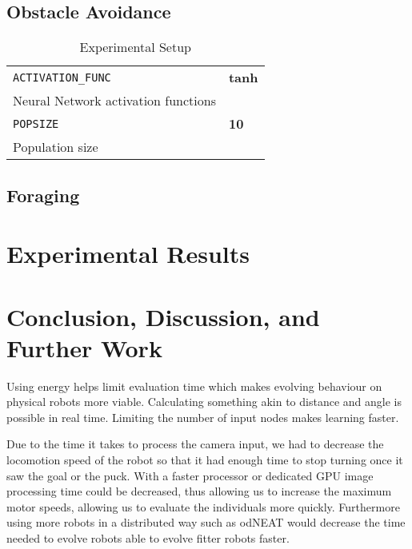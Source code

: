 \documentclass{article}
\begin{document}
	\subsection{Obstacle Avoidance}
\begin{table}
	\centering
	\begin{tabular}{l l}
		\texttt{ACTIVATION\_FUNC} & \textbf{tanh} \\
		Neural Network activation functions & \\
		\texttt{POPSIZE} & \textbf{10} \\
		Population size
	\end{tabular}
	\caption{Experimental Setup}
	\label{tab:obstacle_parameters}
\end{table}

	\subsection{Foraging}


	\section{Experimental Results} %
	\label{sec:results}
	

	\section{Conclusion, Discussion, and Further Work} %
	\label{sec:conclusion}
	Using energy helps limit evaluation time which makes evolving behaviour on
	physical robots more viable.
	Calculating something akin to distance and angle is possible in real time.
	Limiting the number of input nodes makes learning faster. %

	Due to the time it takes to process the camera input, we had to decrease
	the locomotion speed of the robot so that it had enough time to stop
	turning once it saw the goal or the puck. With a faster processor or
	dedicated GPU image processing time could be decreased, thus allowing us to
	increase the maximum motor speeds, allowing us to evaluate the individuals
	more quickly.
	Furthermore using more robots in a distributed way such as
	odNEAT \cite{silva2012odneat} would decrease the time needed to evolve
	robots able to evolve fitter robots faster.
\end{document}
